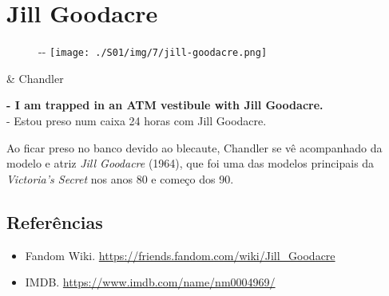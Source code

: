 \hypertarget{jill-goodacre}{%
\section{Jill Goodacre}\label{jill-goodacre}}

\begin{figure}[!ht]
  \begin{adjustwidth}{-\oddsidemargin-1in}{-\rightmargin}
    \centering
    \texttt{[image: ./S01/img/7/jill-goodacre.png]}
  \end{adjustwidth}
\end{figure}

\begin{tcolorbox}[enhanced,center upper,
    drop fuzzy shadow southeast, boxrule=0.3pt,
    lower separated=false, breakable,
    colframe=black!30!dialogoBorder,colback=white]
\begin{minipage}[c]{0.16\linewidth}
   & \centering \scriptsize{Chandler}
\end{minipage}
\hfill
\begin{minipage}[c]{0.8\linewidth}
  \textbf{- I am trapped in an ATM vestibule with Jill Goodacre.}\\
  - Estou preso num caixa 24 horas com Jill Goodacre.
\end{minipage}
\end{tcolorbox}

Ao ficar preso no banco devido ao blecaute, Chandler se vê acompanhado
da modelo e atriz \emph{Jill Goodacre} (1964), que foi uma das modelos
principais da \emph{Victoria's Secret} nos anos 80 e começo dos 90.

\hypertarget{referuxeancias}{%
\subsection{Referências}\label{referuxeancias}}

\begin{itemize}
\tightlist
\item
  \sloppy Fandom Wiki. \url{https://friends.fandom.com/wiki/Jill_Goodacre}
\item
  \sloppy IMDB. \url{https://www.imdb.com/name/nm0004969/}
\end{itemize}

